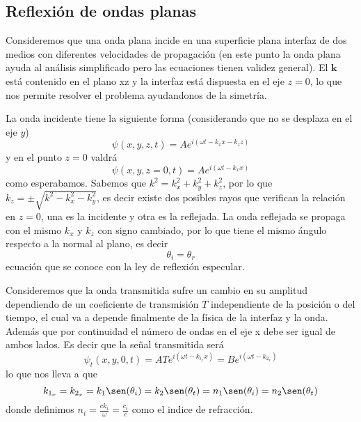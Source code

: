 \documentclass[a4paper,spanish]{article}
\numberwithin{equation}{section}
\begin{document}
	\subsection{Reflexi\'on de ondas planas}
		Consideremos que una onda plana incide en una superficie plana interfaz de dos medios con diferentes velocidades de propagaci\'on (en este punto la onda plana ayuda al an\'alisis simplificado pero las ecuaciones tienen validez general). El $\textbf{k}$ est\'a contenido en el plano xz y la interfaz est\'a dispuesta en el eje $z = 0$, lo que nos permite resolver el problema ayudandonos de la simetr\'ia.
		
		La onda incidente tiene la siguiente forma (considerando que no se desplaza en el eje $y$) \[ \psi(x,y,z,t) = A e^{i (\omega t - k_x x - k_z z)}\] y en el punto $z = 0$ valdr\'a \[\psi(x,y,z=0,t) = A e^{i(\omega t - k_x x)}\] como esperabamos. Sabemos que $k^2 = k_x^2 + k_y^2 + k_z^2$, por lo que $k_z = \pm \sqrt{k^2 - k_x^2 - k_y^2}$, es decir existe dos posibles rayos que verifican la relaci\'on en $z = 0$, una es la incidente y otra es la reflejada. La onda reflejada se propaga con el mismo $k_x$ y $k_z$ con signo cambiado, por lo que tiene el mismo \'angulo respecto a la normal al plano, es decir
		\begin{equation}
			\theta_i = \theta_r
			\label{eq:ondas_reflexion_ley}
		\end{equation}
		ecuaci\'on que se conoce con la ley de reflexi\'on especular.
		
		Consideremos que la onda transmitida sufre un cambio en su amplitud dependiendo de un coeficiente de transmisi\'on $T$ independiente de la posici\'on o del tiempo, el cual va a depende finalmente de la f\'isica de la interfaz y la onda. Adem\'as que por continuidad el n\'umero de ondas en el eje x debe ser igual de ambos lados. Es decir que la se\~nal transmitida ser\'a \[ \psi_t(x,y,0,t) = A T e^{i (\omega t - k_{i_x} x)} = B e^{i(\omega t - k_{2_x})}\]
		lo que nos lleva a que 
		\begin{equation}
			k_{1_x} = k_{2_x} = k_1 \sen(\theta_i) = k_2 \sen(\theta_t) = n_1 \sen(\theta_i) = n_2 \sen(\theta_t)
			\label{eq:ondas_transmision_snell}
		\end{equation}
		donde definimos $n_i = \frac{c k_i}{\omega} = \frac{c_i}{c}$ como el indice de refracci\'on.
		
		
\end{document}
